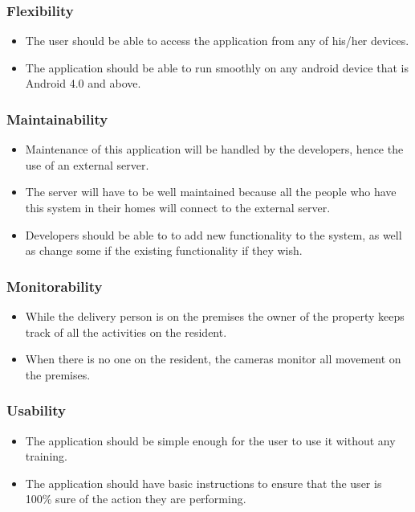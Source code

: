 \documentclass[a4paper,12pt]{article}
\begin{document}
	\subsubsection{Flexibility}
	\begin{itemize}
		\item The user should be able to access the application from any of his/her devices.
		\item The application should be able to run smoothly on any android device that is Android 4.0 and above.
	\end{itemize}
	
	\subsubsection{Maintainability}
	\begin{itemize}
		\item Maintenance of this application will be handled by the developers, hence the use of an external server.
		\item The server will have to be well maintained because all the people who have this system in their homes will connect to the external server. 
		\item Developers should be able to to add new functionality to the system, as well as change some if the existing functionality if they wish.
	\end{itemize}
	
	\subsubsection{Monitorability}
	\begin{itemize}
		\item While the delivery person is on the premises the owner of the property keeps track of all the activities on the resident. 
		\item When there is no one on the resident, the cameras monitor all movement on the premises.  
	\end{itemize}
	
	\subsubsection{Usability}
	\begin{itemize}
		\item The application should be simple enough for the user to use it without any training. 
		\item The application should have basic instructions to ensure that the user is 100\% sure of the action they are performing.
	\end{itemize}
	
\end{document}
